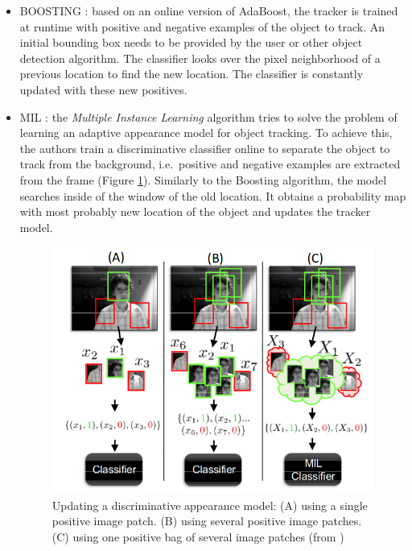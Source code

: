 \begin{itemize}
\item BOOSTING \cite{grabner2006real}: based on an online version of AdaBoost, the tracker is trained at runtime with positive and negative examples of the object to track. An initial bounding box needs to be provided by the user or other object detection algorithm. The classifier looks over the pixel neighborhood of a previous location to find the new location. The classifier is constantly updated with these new positives.
\item MIL \cite{babenko2009visual}: the \textit{Multiple Instance Learning} algorithm tries to solve the problem of learning an adaptive appearance model for object tracking. To achieve this, the authors train a discriminative classifier online to separate the object to track from the background, i.e.\ positive and negative examples are extracted from the frame (Figure \ref{fig:mil}). Similarly to the Boosting algorithm, the model searches inside of the window of the old location. It obtains a probability map with most probably new location of the object and updates the tracker model.
\begin{figure}[H]
\begin{center}
\includegraphics[scale=0.5]{figures/mil.png}
\caption{Updating a discriminative appearance model: (A) using a single positive image patch. (B) using several positive image patches. (C) using one positive bag of several image patches (from \cite{babenko2009visual})}
\label{fig:mil}
\end{center}
\end{figure}

\end{itemize}
